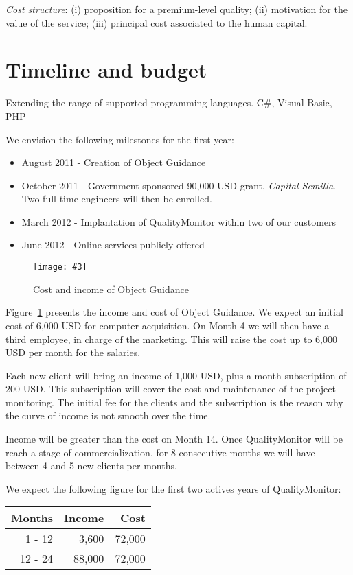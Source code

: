 \documentclass[runningheads]{llncs}
\newcommand{\fig}[4]{
	\begin{figure}[#1]
		\centering
		\texttt{[image: \#3]}
		\caption{\label{fig:#3}#4}
	\end{figure}}
\newcommand{\figref}[1]{Figure~\ref{fig:#1}}
\begin{document}
\noindent\emph{Cost structure}: (i) proposition for a premium-level quality; (ii) motivation for the value of the service; (iii) principal cost associated to the human capital. 

\section{Timeline and budget}

Extending the range of supported programming languages. C\#, Visual Basic, PHP

We envision the following milestones for the first year:

\begin{itemize}
\item August 2011 - Creation of Object Guidance
\item October 2011 - Government sponsored 90,000 USD grant, \emph{Capital Semilla}. Two full time engineers will then be enrolled. 
\item March 2012 - Implantation of QualityMonitor within two of our customers
\item June 2012 - Online services publicly offered 
\end{itemize}

\fig{}{1}{income}{Cost and income of Object Guidance}

\figref{income} presents the income and cost of Object Guidance. We expect an initial cost of 6,000 USD for computer acquisition. On Month 4 we will then have a third employee, in charge of the marketing. This will raise the cost up to 6,000 USD per month for the salaries. 

Each new client will bring an income of 1,000 USD, plus a month subscription of 200 USD. This subscription will cover the cost and maintenance of the project monitoring. The initial fee for the clients and the subscription is the reason why the curve of income is not smooth over the time.

Income will be greater than the cost on Month 14. Once QualityMonitor will be reach a stage of commercialization, for 8 consecutive months we will have between 4 and 5 new clients per months. 

We expect the following figure for the first two actives years of QualityMonitor:
\begin{center}
\begin{tabular}{|r|r|r|}
\hline
\textbf{Months} 	&	\textbf{Income}	& \textbf{Cost} \\\hline\hline
1 - 12	&	3,600	& 72,000\\\hline
12 - 24	&	88,000	& 72,000\\
\hline
\end{tabular}
\end{center}
\end{document}
